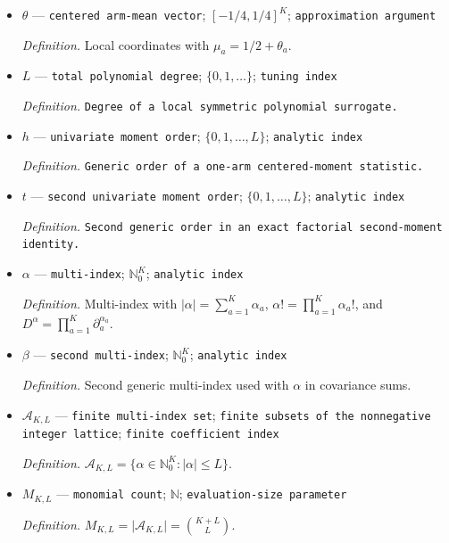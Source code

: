 \documentclass{article}
\begin{document}
\begin{itemize}
  \par\smallskip\noindent\emph{Definition.} \texttt{Local expected count for one treatment arm in one patient group.}
  \item \(\theta\) --- \texttt{centered arm-\allowbreak{}mean vector}; \([-1/4,1/4]^K\); \texttt{approximation argument}
  \par\smallskip\noindent\emph{Definition.} Local coordinates with \(\mu_a=1/2+\theta_a\).
  \item \(L\) --- \texttt{total polynomial degree}; \(\{0,1,\ldots\}\); \texttt{tuning index}
  \par\smallskip\noindent\emph{Definition.} \texttt{Degree of a local symmetric polynomial surrogate.}
  \item \(h\) --- \texttt{univariate moment order}; \(\{0,1,\ldots,L\}\); \texttt{analytic index}
  \par\smallskip\noindent\emph{Definition.} \texttt{Generic order of a one-\allowbreak{}arm centered-\allowbreak{}moment statistic.}
  \item \(t\) --- \texttt{second univariate moment order}; \(\{0,1,\ldots,L\}\); \texttt{analytic index}
  \par\smallskip\noindent\emph{Definition.} \texttt{Second generic order in an exact factorial second-\allowbreak{}moment identity.}
  \item \(\alpha\) --- \texttt{multi-\allowbreak{}index}; \(\mathbb N_0^K\); \texttt{analytic index}
  \par\smallskip\noindent\emph{Definition.} Multi-index with \(\lvert\alpha\rvert=\sum_{a=1}^K\alpha_a\), \(\alpha!=\prod_{a=1}^K\alpha_a!\), and \(D^\alpha=\prod_{a=1}^K\partial_a^{\alpha_a}\).
  \item \(\beta\) --- \texttt{second multi-\allowbreak{}index}; \(\mathbb N_0^K\); \texttt{analytic index}
  \par\smallskip\noindent\emph{Definition.} Second generic multi-index used with \(\alpha\) in covariance sums.
  \item \(\mathcal A_{K,L}\) --- \texttt{finite multi-\allowbreak{}index set}; \texttt{finite subsets of the nonnegative integer lattice}; \texttt{finite coefficient index}
  \par\smallskip\noindent\emph{Definition.} \(\mathcal A_{K,L}=\{\alpha\in\mathbb N_0^K:\lvert\alpha\rvert\le L\}\).
  \item \(M_{K,L}\) --- \texttt{monomial count}; \(\mathbb N\); \texttt{evaluation-\allowbreak{}size parameter}
  \par\smallskip\noindent\emph{Definition.} \(M_{K,L}=\lvert\mathcal A_{K,L}\rvert=\binom{K+L}{L}\).

\end{itemize}
\end{document}
